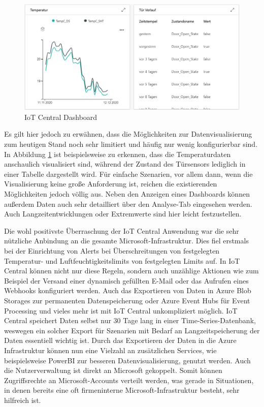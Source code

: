 \begin{figure}[H]
  \vspace{10pt}
  \begin{center}
    \includegraphics[width=1.0\textwidth]{./images/iotcentral-dashboard.png}  
    \end{center}
  \vspace{-5pt}
  \caption[IoT Central Dashboard]{IoT Central Dashboard}
  \label{fig:iotcentral-dashboard}
  \vspace{-10pt}
\end{figure}

Es gilt hier jedoch zu erwähnen, dass die Möglichkeiten zur Datenvisualisierung zum heutigen Stand noch sehr limitiert und häufig nur wenig konfigurierbar sind. In Abbildung \ref{fig:iotcentral-dashboard} ist beispielsweise zu erkennen, dass die Temperaturdaten anschaulich visualisiert sind, während der Zustand des Türsensors lediglich in einer Tabelle dargestellt wird. Für einfache Szenarien, vor allem dann, wenn die Visualisierung keine große Anforderung ist, reichen die existierenden Möglichkeiten jedoch völlig aus. Neben den Anzeigen eines Dashboards können außerdem Daten auch sehr detailliert über den Analyse-Tab eingesehen werden. Auch Langzeitentwicklungen oder Extremwerte sind hier leicht festzustellen.


Die wohl positivste Überraschung der IoT Central Anwendung war die sehr nützliche Anbindung an die gesamte Microsoft-Infrastruktur. Dies fiel erstmals bei der Einrichtung von Alerts bei Überschreitungen von festgelegten Temperatur- und Luftfeuchtigkeitslimits von festgelegten Limits auf. In IoT Central können nicht nur diese Regeln, sondern auch unzählige Aktionen wie zum Beispiel der Versand einer dynamisch gefüllten E-Mail oder das Aufrufen eines Webhooks konfiguriert werden. Auch das Exportieren von Daten in Azure Blob Storages zur permanenten Datenspeicherung oder Azure Event Hubs für Event Processing und vieles mehr ist mit IoT Central unkompliziert möglich. IoT Central speichert Daten selbst nur 30 Tage lang in einer Time-Series-Datenbank, weswegen ein solcher Export für Szenarien mit Bedarf an Langzeitspeicherung der Daten essentiell wichtig ist. Durch das Exportieren der Daten in die Azure Infrastruktur können nun eine Vielzahl an zusätzlichen Services, wie beispielsweise PowerBI zur besseren Datenvisualisierung, genutzt werden. Auch die Nutzerverwaltung ist direkt an Microsoft gekoppelt. Somit können Zugriffsrechte an Microsoft-Accounts verteilt werden, was gerade in Situationen, in denen bereits eine oft firmeninterne Microsoft-Infrastruktur besteht, sehr hilfreich ist.

